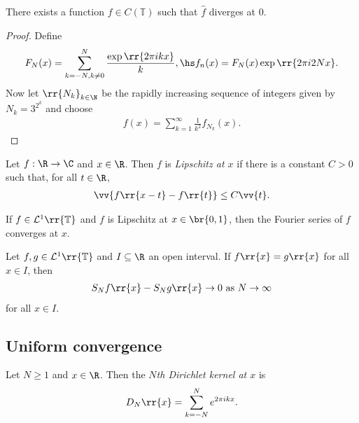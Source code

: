 \documentclass{article}
\begin{document}
\begin{theorem}
  There exists a function $f\in C(\mathbb T)$ such that
  $\hat f$ diverges at $0$.
  \begin{proof}
    Define
    \begin{align*}
      F_N(x) = \sum_{k=-N,k\neq 0}^N \frac{\exp\rr{2\pi ikx}}{k},\hs
      f_n(x) = F_N(x)\exp\rr{2\pi i2Nx}.
    \end{align*}
    Now let $\rr{N_k}_{k\in\N}$ be the rapidly increasing sequence
    of integers given by $N_k = 3^{2^k}$ and choose
    \begin{align*}
      f(x) = \sum_{k=1}^\infty \frac{1}{k^2} f_{N_k}(x).
    \end{align*}
  \end{proof}
\end{theorem}

\begin{definition}
  Let $f:\R\to\C$ and $x\in\R$. Then $f$ is \emph{Lipschitz at $x$} if there is a
  constant $C>0$ such that, for all $t\in\R$,
  \begin{align*}
    \vv{f\rr{x-t}-f\rr{t}}\leq C\vv{t}.
  \end{align*}
\end{definition}

\begin{theorem}
  If $f\in\mathcal L^1\rr{\mathbb T}$ and $f$ is Lipschitz at $x\in\br{0,1}$,
  then the Fourier series of $f$ converges at $x$.
\end{theorem}

\begin{theorem}
  Let $f,g\in\mathcal L^1\rr{\mathbb T}$ and $I\subseteq\R$ an open interval.
  If $f\rr{x}=g\rr{x}$ for all $x\in I$, then
  \begin{align*}
    S_N f\rr{x}-S_N g\rr{x}\to 0 \text{ as } N\to\infty
  \end{align*}
  for all $x\in I$.
\end{theorem}

\subsection{Uniform convergence}

\begin{definition}
  Let $N\geq 1$ and $x\in\R$. Then the \emph{$N$th Dirichlet kernel at $x$} is
  \begin{align*}
    D_N\rr{x}=\sum_{k=-N}^N e^{2\pi ikx}.
  \end{align*}
\end{definition}
\end{document}
